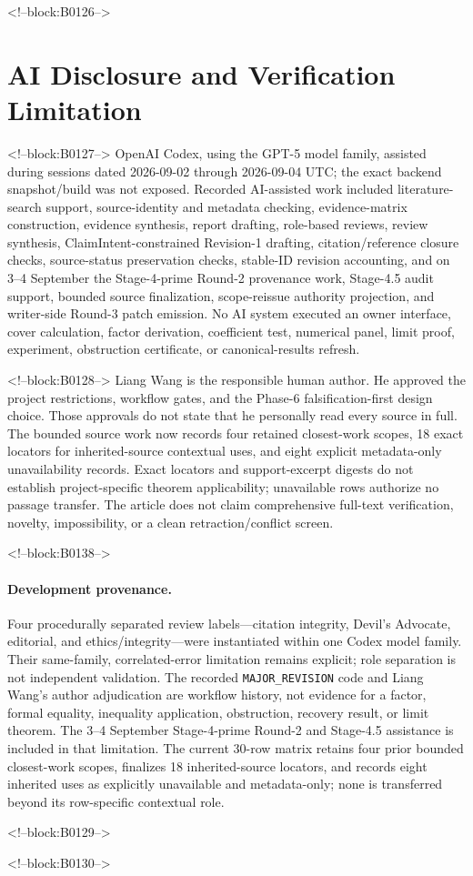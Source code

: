 \documentclass[11pt]{article}
\begin{document}
<!--block:B0126-->
\hypertarget{ai-disclosure-and-verification-limitation}{%
\section*{AI Disclosure and Verification
Limitation}\label{ai-disclosure-and-verification-limitation}}

<!--block:B0127-->
OpenAI Codex, using the GPT-5 model family, assisted during
sessions dated 2026-09-02 through 2026-09-04 UTC; the exact backend snapshot/build
was not exposed. Recorded AI-assisted work included literature-search support,
source-identity and metadata checking, evidence-matrix construction, evidence
synthesis, report drafting, role-based reviews, review synthesis,
ClaimIntent-constrained Revision-1 drafting, citation/reference closure checks,
source-status preservation checks, stable-ID revision accounting, and on 3--4
September the Stage-4-prime Round-2 provenance work, Stage-4.5 audit support,
bounded source finalization, scope-reissue authority projection, and writer-side
Round-3 patch emission. No AI system executed an owner interface, cover calculation,
factor derivation, coefficient test, numerical panel, limit proof, experiment,
obstruction certificate, or canonical-results refresh.

<!--block:B0128-->
Liang Wang is the responsible human author. He approved the
project restrictions, workflow gates, and the Phase-6 falsification-first design
choice. Those approvals do not state that he personally read every source in full.
The bounded source work now records four retained closest-work scopes, 18 exact
locators for inherited-source contextual uses, and eight explicit metadata-only
unavailability records. Exact locators and support-excerpt digests do not establish
project-specific theorem applicability; unavailable rows authorize no passage
transfer. The article does not claim comprehensive full-text verification, novelty,
impossibility, or a clean retraction/conflict screen.

<!--block:B0138-->
\begingroup\sloppy
\paragraph{Development provenance.} Four procedurally separated review
labels---citation integrity, Devil's Advocate, editorial, and ethics/integrity---were
instantiated within one Codex model family. Their same-family, correlated-error
limitation remains explicit; role separation is not independent validation. The
recorded \texttt{MAJOR\_REVISION} code and Liang Wang's author adjudication are
workflow history, not evidence for a factor, formal equality, inequality application,
obstruction, recovery result, or limit theorem. The 3--4 September Stage-4-prime
Round-2 and Stage-4.5 assistance is included in that limitation. The current 30-row
matrix retains four prior bounded closest-work scopes, finalizes 18 inherited-source
locators, and records eight inherited uses as explicitly unavailable and
metadata-only; none is transferred beyond its row-specific contextual role.
\par\endgroup

<!--block:B0129-->



<!--block:B0130-->
\end{document}
